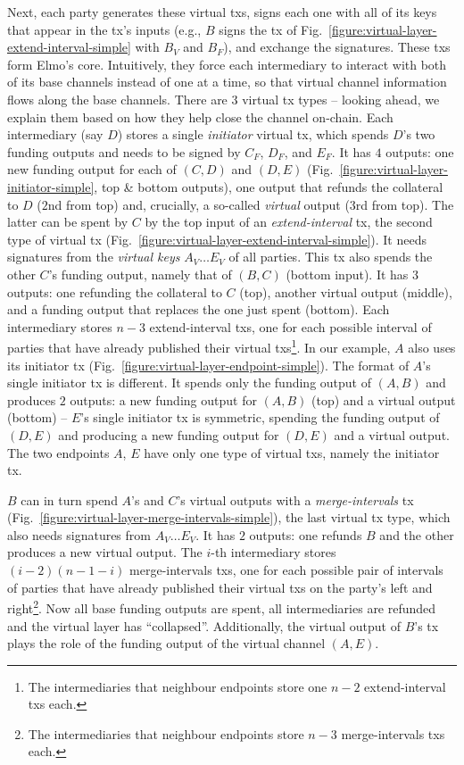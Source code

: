  Next, each party generates these virtual txs, signs each one with all of its
  keys that appear in the tx's inputs (e.g., $B$ signs the tx of
  Fig.~\ref{figure:virtual-layer-extend-interval-simple} with $B_V$ and $B_F$),
  and exchange the signatures.
  These txs form
  Elmo's core. Intuitively, they force each intermediary to interact with both of its
  base channels instead of one at a time, so that virtual channel information
  flows along the base channels. There are $3$ virtual
  tx types -- looking ahead, we explain them based on how they help
  close the channel on-chain. Each
  intermediary (say $D$) stores a single \emph{initiator} virtual tx, which spends
  $D$'s two funding outputs and needs to be signed by $C_F$, $D_F$, and $E_F$.
  It has $4$ outputs: one new funding
  output for each of $(C, D)$ and $(D, E)$
  (Fig.~\ref{figure:virtual-layer-initiator-simple}, top \& bottom outputs), one
  output that refunds the collateral to $D$ ($2$nd from top) and,
  crucially, a so-called \emph{virtual} output ($3$rd from top). The latter
  can be spent by $C$ by the top input of an \emph{extend-interval} tx, the second type of virtual
  tx (Fig.~\ref{figure:virtual-layer-extend-interval-simple}). It needs
  signatures from the \emph{virtual keys} $A_V \dots E_V$ of all parties. This
  tx also spends the other $C$'s funding output, namely that of $(B,C)$ (bottom
  input). It has $3$ outputs: one refunding the collateral to $C$
  (top), another virtual output (middle), and a funding output that replaces the
  one just spent (bottom). Each intermediary stores $n-3$ extend-interval txs,
  one for each possible interval of parties that have already published their
  virtual txs\footnote{The intermediaries that neighbour endpoints store one
  $n-2$ extend-interval txs each.}. In our example, $A$ also uses its initiator tx
  (Fig.~\ref{figure:virtual-layer-endpoint-simple}). The format of $A$'s single
  initiator tx is different. It spends only the funding output of
  $(A, B)$ and produces $2$ outputs: a new funding output for $(A, B)$ (top) and
  a virtual output (bottom) -- $E$'s single initiator tx is symmetric, spending the
  funding output of $(D, E)$ and producing a new funding output for $(D, E)$ and
  a virtual output. The two endpoints $A$,
  $E$ have only one type of virtual txs, namely the initiator tx.

  $B$ can in
  turn spend $A$'s and $C$'s virtual outputs with a
  \emph{merge-intervals} tx
  (Fig.~\ref{figure:virtual-layer-merge-intervals-simple}), the last virtual tx
  type, which also needs signatures from $A_V \dots E_V$. It has $2$ outputs: one refunds $B$ and
  the other produces a new virtual
  output. The $i$-th intermediary stores $(i-2)(n-1-i)$ merge-intervals txs, one for
  each possible pair of intervals of parties that have already published their
  virtual txs on the party's left and right\footnote{The intermediaries that neighbour
  endpoints store $n-3$ merge-intervals txs each.}. Now
  all base funding outputs are spent, all intermediaries are refunded and the
  virtual layer has ``collapsed''. Additionally, the
  virtual output of $B$'s tx plays the role of the funding output of the virtual
  channel $(A, E)$.

